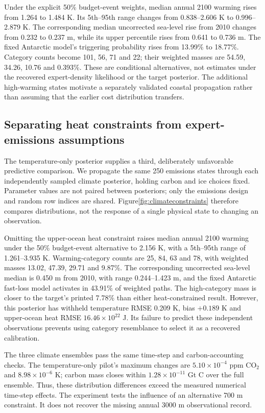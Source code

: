 Under the explicit 50\% budget-event weights, median annual 2100 warming rises
from 1.264 to 1.484 K. Its 5th--95th range changes from 0.838--2.606 K to
0.996--2.879 K. The corresponding median uncorrected sea-level rise from 2010
changes from 0.232 to 0.237 m, while its upper percentile rises from 0.641 to
0.736 m. The fixed Antarctic model's triggering probability rises from 13.99\%
to 18.77\%. Category counts become 101, 56, 71 and 22; their weighted masses
are 54.59, 34.26, 10.76 and 0.393\%. These are conditional alternatives, not
estimates under the recovered expert-density likelihood or the target posterior.
The additional high-warming states motivate a separately validated coastal
propagation rather than assuming that the earlier cost distribution transfers.

\subsection{Separating heat constraints from expert-emissions assumptions}
The temperature-only posterior supplies a third, deliberately unfavorable
predictive comparison. We propagate the same 250 emissions states through
each independently sampled climate posterior, holding carbon and ice choices
fixed. Parameter values are not paired between posteriors; only the emissions
design and random row indices are shared. Figure\ref{fig:climateconstraints}
therefore compares distributions, not the response of a single physical state
to changing an observation.

Omitting the upper-ocean heat constraint raises median annual 2100 warming
under the 50\% budget-event alternative to 2.156 K, with a 5th--95th range of
1.261--3.935 K. Warming-category counts are 25, 84, 63 and 78, with weighted
masses 13.02, 47.39, 29.71 and 9.87\%. The corresponding uncorrected sea-level
median is 0.450 m from 2010, with range 0.244--1.423 m, and the fixed Antarctic
fast-loss model activates in 43.91\% of weighted paths. The high-category mass
is closer to the target's printed 7.78\% than either heat-constrained result.
However, this posterior has withheld temperature RMSE 0.209 K, bias
$+0.189$ K and upper-ocean heat RMSE $16.46\times10^{22}$ J. Its failure to
predict these independent observations prevents using category resemblance
to select it as a recovered calibration.

The three climate ensembles pass the same time-step and carbon-accounting
checks. The temperature-only pilot's maximum changes are
$5.10\times10^{-4}$ ppm CO$_2$ and $8.98\times10^{-6}$ K; carbon mass closes
within $1.28\times10^{-11}$ Gt C over the full ensemble. Thus, these distribution
differences exceed the measured numerical time-step effects. The experiment
tests the influence of an alternative 700 m constraint. It does not recover the
missing annual 3000 m observational record.

